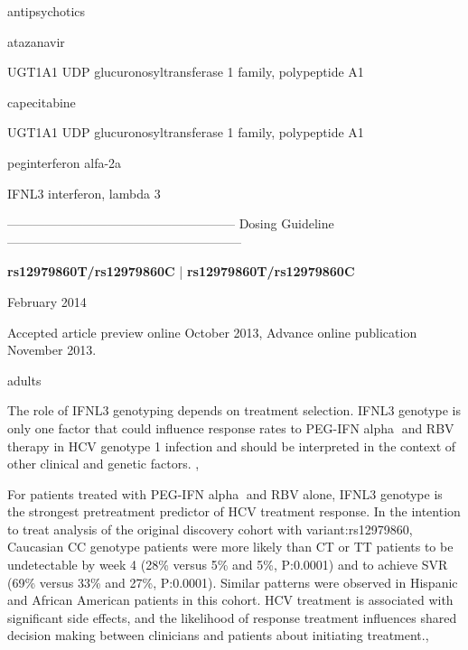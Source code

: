\documentclass{resume} %
\begin{document}
\begin{rSection}{ antipsychotics }
\begin{rSection}{ atazanavir }
\begin{rSubsection}{ UGT1A1 }{ UDP glucuronosyltransferase 1 family, polypeptide A1 }{}{}
\begin{rSection}{ capecitabine }
\begin{rSubsection}{ UGT1A1 }{ UDP glucuronosyltransferase 1 family, polypeptide A1 }{}{}
\begin{rSection}{ peginterferon alfa-2a }
\item[]
\begin{rSubsection}{ IFNL3 }{ interferon, lambda 3 }{}{}
\item[]
\item[] ------------------------------------------------------ Dosing Guideline --------------------------------------------------------\newline
\item[]
\item[] \textbf{ rs12979860T/rs12979860C } | \textbf{ rs12979860T/rs12979860C }
\item February 2014
 \newline
\item Accepted article preview online October 2013,  Advance online publication November 2013.
 \newline
\item adults
 \newline
\item The role of IFNL3 genotyping depends on treatment selection. IFNL3 genotype is only one factor that could influence response rates to PEG-IFN alpha and RBV therapy in HCV genotype 1 infection and should be interpreted in the context of other clinical and genetic factors. , 
 \newline
\item For patients treated with PEG-IFN alpha and RBV alone, IFNL3 genotype is the strongest pretreatment predictor of HCV treatment response. In the intention to treat analysis of the original discovery cohort with variant:rs12979860, Caucasian CC genotype patients were more likely than CT or TT patients to be undetectable by week 4 (28\% versus 5\% and 5\%, P:0.0001) and to achieve SVR (69\% versus 33\% and 27\%, P:0.0001). Similar patterns were observed in Hispanic and African American patients in this cohort. HCV treatment is associated with significant side effects, and the likelihood of response treatment influences shared decision making between clinicians and patients about initiating treatment.,  
 \newline

\end{rSubsection}
\end{rSection}
\end{rSubsection}
\end{rSection}
\end{rSubsection}
\end{rSection}
\end{rSection}
\end{document}
